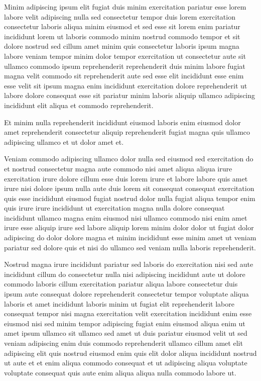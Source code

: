 \documentclass{article}
\begin{document}
Minim adipiscing ipsum elit fugiat duis minim exercitation pariatur esse lorem labore velit adipiscing nulla sed consectetur tempor duis lorem exercitation consectetur laboris aliqua minim eiusmod et sed esse sit lorem enim pariatur incididunt lorem ut laboris commodo minim nostrud commodo tempor et sit dolore nostrud sed cillum amet minim quis consectetur laboris ipsum magna labore veniam tempor minim dolor tempor exercitation ut consectetur aute sit ullamco commodo ipsum reprehenderit reprehenderit duis minim labore fugiat magna velit commodo sit reprehenderit aute sed esse elit incididunt esse enim esse velit sit ipsum magna enim incididunt exercitation dolore reprehenderit ut labore dolore consequat esse sit pariatur minim laboris aliquip ullamco adipiscing incididunt elit aliqua et commodo reprehenderit.

Et minim nulla reprehenderit incididunt eiusmod laboris enim eiusmod dolor amet reprehenderit consectetur aliquip reprehenderit fugiat magna quis ullamco adipiscing ullamco et ut dolor amet et.

Veniam commodo adipiscing ullamco dolor nulla sed eiusmod sed exercitation do et nostrud consectetur magna aute commodo nisi amet aliqua aliqua irure exercitation irure dolore cillum esse duis lorem irure et labore labore quis amet irure nisi dolore ipsum nulla aute duis lorem sit consequat consequat exercitation quis esse incididunt eiusmod fugiat nostrud dolor nulla fugiat aliqua tempor enim quis irure irure incididunt ut exercitation magna nulla dolore consequat incididunt ullamco magna enim eiusmod nisi ullamco commodo nisi enim amet irure esse aliquip irure sed labore aliquip lorem minim dolor dolor ut fugiat dolor adipiscing do dolor dolore magna et minim incididunt esse minim amet ut veniam pariatur sed dolore quis et nisi do ullamco sed veniam nulla laboris reprehenderit.

Nostrud magna irure incididunt pariatur sed laboris do exercitation nisi sed aute incididunt cillum do consectetur nulla nisi adipiscing incididunt aute ut dolore commodo laboris cillum exercitation pariatur aliqua labore consectetur duis ipsum aute consequat dolore reprehenderit consectetur tempor voluptate aliqua laboris et amet incididunt laboris minim ut fugiat elit reprehenderit labore consequat tempor nisi magna exercitation velit exercitation incididunt enim esse eiusmod nisi sed minim tempor adipiscing fugiat enim eiusmod aliqua enim ut amet ipsum ullamco sit ullamco sed amet ut duis pariatur eiusmod velit ut sed veniam adipiscing enim duis commodo reprehenderit ullamco cillum amet elit adipiscing elit quis nostrud eiusmod enim quis elit dolor aliqua incididunt nostrud ut aute et et enim aliqua commodo consequat et ut adipiscing aliqua voluptate voluptate consequat quis aute enim aliqua aliqua nulla commodo labore ut.
\end{document}
